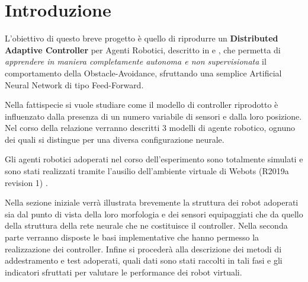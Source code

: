 \section{Introduzione}

L'obiettivo di questo breve progetto è quello di riprodurre un \textbf{Distributed Adaptive Controller} per Agenti Robotici, descritto in \cite{pfeifer2001understanding} e \cite{verschure1992distributed}, che permetta di \textit{apprendere in maniera completamente autonoma e non supervisionata} il comportamento della Obstacle-Avoidance, sfruttando una semplice Artificial Neural Network di tipo Feed-Forward.

Nella fattispecie si vuole studiare come il modello di controller riprodotto è influenzato dalla presenza di un numero variabile di sensori e dalla loro posizione. Nel corso della relazione verranno descritti 3 modelli di agente robotico, ognuno dei quali si distingue per una diversa configurazione neurale.

Gli agenti robotici adoperati nel corso dell'esperimento sono totalmente simulati e sono stati realizzati tramite l'ausilio dell'ambiente virtuale di Webots (R2019a revision 1) \cite{michel2004cyberbotics}.

Nella sezione iniziale verrà illustrata brevemente la struttura dei robot adoperati sia dal punto di vista della loro morfologia e dei sensori equipaggiati che da quello della struttura della rete neurale che ne costituisce il controller. 
Nella seconda parte verranno disposte le basi implementative che hanno permesso la realizzazione dei controller.
Infine si procederà alla descrizione dei metodi di addestramento e test adoperati, quali dati sono stati raccolti in tali fasi e gli indicatori sfruttati per valutare le performance dei robot virtuali.


